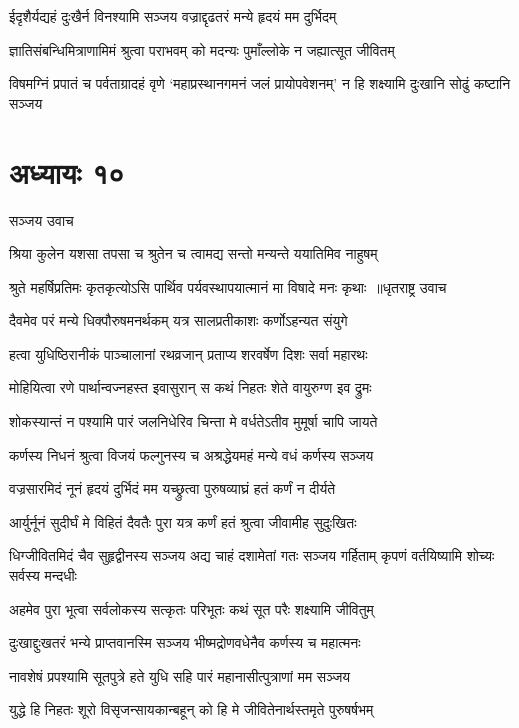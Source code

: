 \twolineshloka
{ईदृशैर्यद्यहं दुःखैर्न विनश्यामि सञ्जय}
{वज्राद्दृढतरं मन्ये हृदयं मम दुर्भिदम्}


\twolineshloka
{ज्ञातिसंबन्धिमित्राणामिमं श्रुत्वा पराभवम्}
{को मदन्यः पुमाँल्लोके न जह्यात्सूत जीवितम्}


\threelineshloka
{विषमग्निं प्रपातं च पर्वताग्रादहं वृणे}
{`महाप्रस्थानगमनं जलं प्रायोपवेशनम्'}
{न हि शक्ष्यामि दुःखानि सोढुं कष्टानि सञ्जय}


\chapter{अध्यायः १०}
\twolineshloka
{सञ्जय उवाच}
{}


\twolineshloka
{श्रिया कुलेन यशसा तपसा च श्रुतेन च}
{त्वामद्य सन्तो मन्यन्ते ययातिमिव नाहुषम्}


\threelineshloka
{श्रुते महर्षिप्रतिमः कृतकृत्योऽसि पार्थिव}
{पर्यवस्थापयात्मानं मा विषादे मनः कृथाः ॥धृतराष्ट्र उवाच}
{}


\twolineshloka
{दैवमेव परं मन्ये धिक्पौरुषमनर्थकम्}
{यत्र सालप्रतीकाशः कर्णोऽहन्यत संयुगे}


\twolineshloka
{हत्वा युधिष्ठिरानीकं पाञ्चालानां रथव्रजान्}
{प्रताप्य शरवर्षेण दिशः सर्वा महारथः}


\twolineshloka
{मोहियित्वा रणे पार्थान्वज्नहस्त इवासुरान्}
{स कथं निहतः शेते वायुरुग्ण इव द्रुमः}


\twolineshloka
{शोकस्यान्तं न पश्यामि पारं जलनिधेरिव}
{चिन्ता मे वर्धतेऽतीव मुमूर्षा चापि जायते}


\twolineshloka
{कर्णस्य निधनं श्रुत्वा विजयं फल्गुनस्य च}
{अश्रद्धेयमहं मन्ये वधं कर्णस्य सञ्जय}


\twolineshloka
{वज्रसारमिदं नूनं हृदयं दुर्भिदं मम}
{यच्छ्रुत्वा पुरुषव्याघ्रं हतं कर्णं न दीर्यते}


\twolineshloka
{आर्युर्नूनं सुदीर्घं मे विहितं दैवतैः पुरा}
{यत्र कर्णं हतं श्रुत्वा जीवामीह सुदुःखितः}


\threelineshloka
{धिग्जीवितमिदं चैव सुहृद्वीनस्य सञ्जय}
{अद्य चाहं दशामेतां गतः सञ्जय गर्हिताम्}
{कृपणं वर्तयिष्यामि शोच्यः सर्वस्य मन्दधीः}


\twolineshloka
{अहमेव पुरा भूत्वा सर्वलोकस्य सत्कृतः}
{परिभूतः कथं सूत परैः शक्ष्यामि जीवितुम्}


\twolineshloka
{दुःखाद्दुःखतरं भन्ये प्राप्तवानस्मि सञ्जय}
{भीष्मद्रोणवधेनैव कर्णस्य च महात्मनः}


\twolineshloka
{नावशेषं प्रपश्यामि सूतपुत्रे हते युधि}
{सहि पारं महानासीत्पुत्राणां मम सञ्जय}


\twolineshloka
{युद्धे हि निहतः शूरो विसृजन्सायकान्बहून्}
{को हि मे जीवितेनार्थस्तमृते पुरुषर्षभम्}


